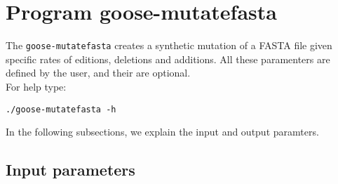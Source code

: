 \section{Program goose-mutatefasta}
The \texttt{goose-mutatefasta} creates a synthetic mutation of a FASTA file given specific rates of editions, deletions and additions. All these paramenters are defined by the user, and their are optional.\\
For help type:
\begin{lstlisting}
./goose-mutatefasta -h
\end{lstlisting}
In the following subsections, we explain the input and output paramters.

\subsection*{Input parameters}

